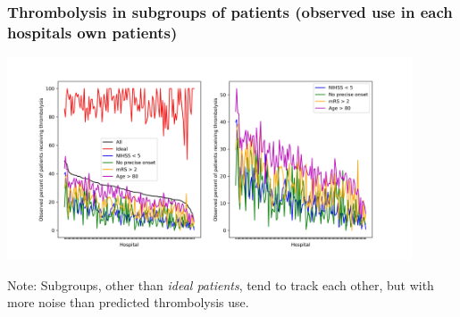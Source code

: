 \documentclass{beamer}
\begin{document}
\begin{frame}
\frametitle{Thrombolysis in subgroups of patients (observed use in each hospitals own patients)}

    \begin{center}
    \includegraphics[width=0.9\textwidth]{./images/15a_actual_subgroup.jpg}
    \end{center}

\footnotesize Note: Subgroups, other than \emph{ideal patients}, tend to track each other, but with more noise than predicted thrombolysis use. 

\end{frame}

\end{document}

